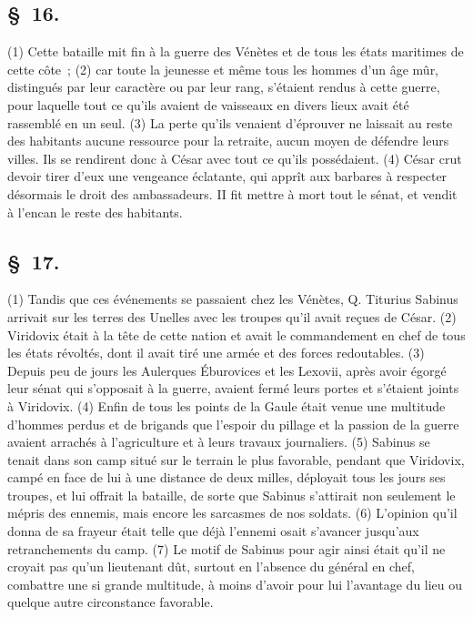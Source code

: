 \documentclass[french,twoside]{book} %
\begin{document}
\subsection[{§ 16.}]{ \textsc{§ 16.} }
\noindent (1) Cette bataille mit fin à la guerre des Vénètes et de tous les états maritimes de cette côte ; (2) car toute la jeunesse et même tous les hommes d’un âge mûr, distingués par leur caractère ou par leur rang, s’étaient rendus à cette guerre, pour laquelle tout ce qu’ils avaient de vaisseaux en divers lieux avait été rassemblé en un seul. (3) La perte qu’ils venaient d’éprouver ne laissait au reste des habitants aucune ressource pour la retraite, aucun moyen de défendre leurs villes. Ils se rendirent donc à César avec tout ce qu’ils possédaient. (4) César crut devoir tirer d’eux une vengeance éclatante, qui apprît aux barbares à respecter désormais le droit des ambassadeurs. II fit mettre à mort tout le sénat, et vendit à l’encan le reste des habitants.
\subsection[{§ 17.}]{ \textsc{§ 17.} }
\noindent (1) Tandis que ces événements se passaient chez les Vénètes, Q. Titurius Sabinus arrivait sur les terres des Unelles avec les troupes qu’il avait reçues de César. (2) Viridovix était à la tête de cette nation et avait le commandement en chef de tous les états révoltés, dont il avait tiré une armée et des forces redoutables. (3) Depuis peu de jours les Aulerques Éburovices et les Lexovii, après avoir égorgé leur sénat qui s’opposait à la guerre, avaient fermé leurs portes et s’étaient joints à Viridovix. (4) Enfin de tous les points de la Gaule était venue une multitude d’hommes perdus et de brigands que l’espoir du pillage et la passion de la guerre avaient arrachés à l’agriculture et à leurs travaux journaliers. (5) Sabinus se tenait dans son camp situé sur le terrain le plus favorable, pendant que Viridovix, campé en face de lui à une distance de deux milles, déployait tous les jours ses troupes, et lui offrait la bataille, de sorte que Sabinus s’attirait non seulement le mépris des ennemis, mais encore les sarcasmes de nos soldats. (6) L'opinion qu’il donna de sa frayeur était telle que déjà l’ennemi osait s’avancer jusqu’aux retranchements du camp. (7) Le motif de Sabinus pour agir ainsi était qu’il ne croyait pas qu’un lieutenant dût, surtout en l’absence du général en chef, combattre une si grande multitude, à moins d’avoir pour lui l’avantage du lieu ou quelque autre circonstance favorable.
\end{document}
